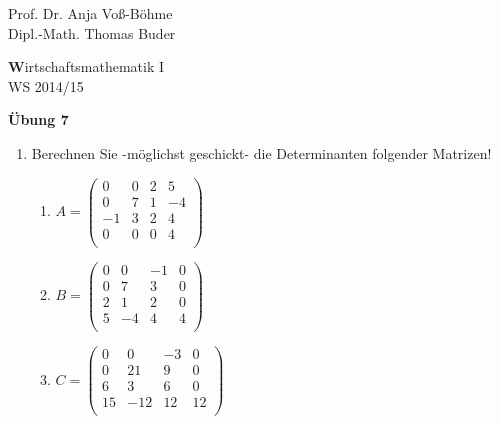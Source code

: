 \documentclass[12pt,a4paper]{scrreprt}
\begin{document}
 
\begin{flushleft}
Prof. Dr.  Anja Voß-Böhme \\
Dipl.-Math. Thomas Buder
\end{flushleft}

\begin{center}{\large\textbf Wirtschaftsmathematik I} \\ WS 2014/15 \end{center}

\begin{center}
\large{\textbf{ Übung 7 }} 
\end{center}

\bigskip
\begin{enumerate}

	\item Berechnen Sie -möglichst geschickt- die Determinanten folgender Matrizen!
	\begin{enumerate}
		\item $A=\begin{pmatrix}
0 & 0 & 2 & 5 \\
0 & 7 & 1 & -4  \\
-1 & 3 & 2 & 4\\
0 & 0 & 0 & 4 \\
\end{pmatrix}$


		\item $B=\begin{pmatrix}
0 & 0 & -1 & 0 \\
0 & 7 & 3 & 0  \\
2 & 1 & 2 & 0\\
5 & -4 & 4 & 4 \\
\end{pmatrix}$


		\item $C=\begin{pmatrix}
0 & 0 & -3 & 0 \\
0 & 21 & 9 & 0  \\
6 & 3 & 6 & 0\\
15 & -12 & 12 & 12 \\
\end{pmatrix}$


\begin{comment}
\item $D=\begin{pmatrix}
0 & 0 & -3 & 0 \\
0 & 21 & 9 & 0  \\
6 & 3 & 6 & 0\\
21 & -9 & 18 & 12 \\
\end{pmatrix}$
\end{comment}


\end{enumerate}
\end{enumerate}
\end{document}
